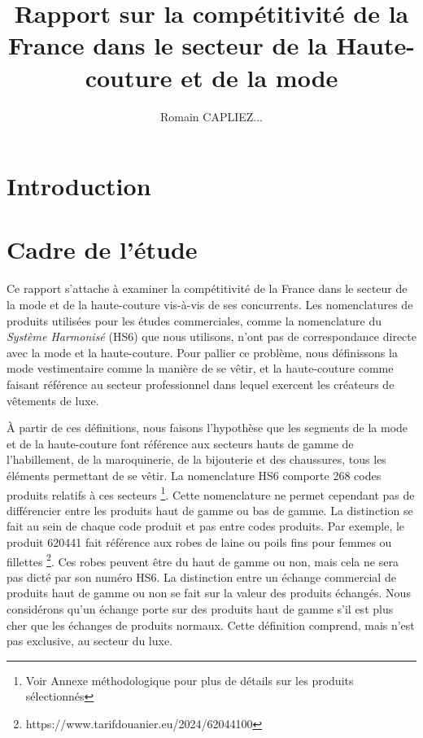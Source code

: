 \documentclass[french,10pt,a4paper]{article}
\title{Rapport sur la compétitivité de la France dans le secteur de la Haute-couture et de la mode}
\author{Romain CAPLIEZ...}
\begin{document}
\maketitle

\newpage

\tableofcontents

\newpage

\section{Introduction}

\newpage

\section{Cadre de l'étude}
Ce rapport s'attache à examiner la compétitivité de la France dans le secteur de la mode et de la haute-couture vis-à-vis de ses concurrents. Les nomenclatures de produits utilisées pour les études commerciales, comme la nomenclature du \textit{Système Harmonisé} (HS6) que nous utilisons, n'ont pas de correspondance directe avec la mode et la haute-couture. Pour pallier ce problème, nous définissons la mode vestimentaire comme la manière de se vêtir, et la haute-couture comme faisant référence au secteur professionnel dans lequel exercent les créateurs de vêtements de luxe.

À partir de ces définitions, nous faisons l'hypothèse que les segments de la mode et de la haute-couture font référence aux secteurs hauts de gamme de l'habillement, de la maroquinerie, de la bijouterie et des chaussures, tous les éléments permettant de se vêtir. La nomenclature HS6 comporte 268 codes produits relatifs à ces secteurs \footnote{Voir Annexe méthodologique pour plus de détails sur les produits sélectionnés}. Cette nomenclature ne permet cependant pas de différencier entre les produits haut de gamme ou bas de gamme. La distinction se fait au sein de chaque code produit et pas entre codes produits. Par exemple, le produit 620441 fait référence aux \og robes de laine ou poils fins pour femmes ou fillettes \fg{} \footnote{https://www.tarifdouanier.eu/2024/62044100}. Ces robes peuvent être du haut de gamme ou non, mais cela ne sera pas dicté par son numéro HS6. La distinction entre un échange commercial de produits haut de gamme ou non se fait sur la valeur des produits échangés. Nous considérons qu'un échange porte sur des produits haut de gamme s'il est plus cher que les échanges de produits \og normaux\fg{}. Cette définition comprend, mais n'est pas exclusive, au secteur du luxe.
\end{document}
